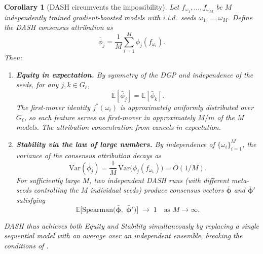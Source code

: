 \documentclass[11pt]{article}
\newtheorem{corollary}[theorem]{Corollary}
\theoremstyle{remark}
\newcommand{\Gl}{G_\ell}                    %
\newcommand{\phij}{\phi_j}                  %
\newcommand{\Exp}{\mathbb{E}}              %
\newcommand{\Var}{\mathrm{Var}}            %
\newcommand{\dash}{\textsc{DASH}}
\begin{document}
\begin{corollary}[\dash{} circumvents the impossibility]
\label{cor:dash}
Let $f_{\omega_1}, \dots, f_{\omega_M}$ be $M$ independently trained
gradient-boosted models with i.i.d.\ seeds $\omega_1, \dots, \omega_M$.
Define the \dash{} consensus attribution as
\begin{equation}
  \bar{\phi}_j = \frac{1}{M} \sum_{i=1}^{M} \phij(f_{\omega_i}).
\end{equation}
Then:
\begin{enumerate}
  \item[(a)] \textbf{Equity in expectation.} By symmetry of the DGP and
    independence of the seeds, for any $j, k \in \Gl$,
    \begin{equation}
      \Exp[\bar{\phi}_j] = \Exp[\bar{\phi}_k].
    \end{equation}
    The first-mover identity $j^*(\omega_i)$ is approximately uniformly
    distributed over $\Gl$, so each feature serves as first-mover in
    approximately $M/m$ of the $M$ models.  The attribution concentration
    from  cancels in expectation.

  \item[(b)] \textbf{Stability via the law of large numbers.}
    By independence of $\{\omega_i\}_{i=1}^M$, the variance of the
    consensus attribution decays as
    \begin{equation}
      \Var(\bar{\phi}_j)
        = \frac{1}{M}\, \Var\bigl(\phij(f_{\omega_1})\bigr)
        = O(1/M).
    \end{equation}
    For sufficiently large $M$, two independent \dash{} runs (with
    different meta-seeds controlling the $M$ individual seeds) produce
    consensus vectors $\bar{\boldsymbol{\phi}}$ and
    $\bar{\boldsymbol{\phi}}'$ satisfying
    \begin{equation}
      \Exp\bigl[\mathrm{Spearman}\bigl(
        \bar{\boldsymbol{\phi}},\;
        \bar{\boldsymbol{\phi}}'
      \bigr)\bigr] \;\to\; 1
      \quad \text{as } M \to \infty.
    \end{equation}
\end{enumerate}
\dash{} thus achieves both Equity and Stability simultaneously by
replacing a single sequential model with an average over an independent
ensemble, breaking the conditions of .
\end{corollary}
\end{document}
